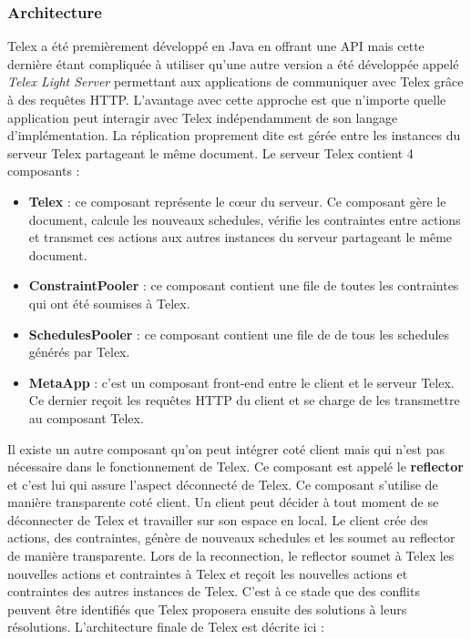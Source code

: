 \documentclass[a4paper,14pt]{article}
\begin{document}
\subsubsection{Architecture}
Telex a été premièrement développé en Java en offrant une API mais cette dernière étant compliquée à utiliser qu'une autre version a été développée
appelé \textit{Telex Light Server} permettant aux applications de communiquer avec Telex grâce à des requêtes HTTP. L'avantage avec cette approche est 
que n'importe quelle application peut interagir avec Telex indépendamment de son langage d'implémentation. La réplication proprement dite est gérée entre les instances du serveur Telex partageant le même document.
\newline Le serveur Telex contient 4 composants :
\begin{itemize}
\item \textbf{Telex} : ce composant représente le cœur du serveur. Ce composant gère le document, calcule les nouveaux schedules, vérifie les contraintes entre actions et transmet 
ces actions aux autres instances du serveur partageant le même document. 
\item \textbf{ConstraintPooler} : ce composant contient une file de toutes les contraintes qui ont été soumises  à Telex.
\item \textbf{SchedulesPooler} : ce composant contient une file de de tous les schedules générés par Telex.
\item \textbf{MetaApp} : c'est un composant front-end entre le client et le serveur Telex. Ce dernier reçoit les requêtes HTTP du client  et se charge de les transmettre au composant Telex. 
\end{itemize}

Il existe un autre composant qu'on peut intégrer coté client mais qui n'est pas nécessaire dans le fonctionnement de Telex. Ce composant est appelé le \textbf{reflector} et c'est lui qui assure l'aspect déconnecté de Telex. Ce composant s'utilise de manière transparente coté client. Un client peut décider à tout moment de se déconnecter de Telex et travailler sur son espace en local. Le client crée des actions, des contraintes, génère de nouveaux schedules et les soumet au reflector de manière transparente. Lors de la reconnection, le reflector soumet à Telex les nouvelles actions et contraintes à Telex et reçoit les nouvelles actions et contraintes des autres instances de Telex. C'est à ce stade que des conflits peuvent être identifiés que Telex proposera ensuite des solutions à leurs résolutions.
L'architecture finale de Telex est décrite ici : 
\end{document}
